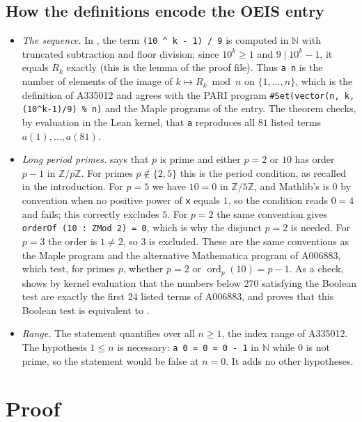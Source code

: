 \documentclass[11pt]{amsart}
\theoremstyle{plain}
\theoremstyle{definition}
\newcommand{\N}{\mathbb{N}}
\newcommand{\Z}{\mathbb{Z}}
\DeclareMathOperator{\ord}{ord}
\begin{document}
\subsection*{How the definitions encode the OEIS entry}
\begin{itemize}
\item \emph{The sequence.} In , the term \texttt{(10 \^{} k - 1) / 9} is computed in $\N$ with truncated subtraction and floor division; since $10^k\ge1$ and $9\mid 10^k-1$, it equals $R_k$ exactly (this is the lemma  of the proof file). Thus \texttt{a n} is the number of elements of the image of $k\mapsto R_k \bmod n$ on $\{1,\dots,n\}$, which is the definition of A335012 and agrees with the PARI program \texttt{\#Set(vector(n, k, (10\^{}k-1)/9) \% n)} and the Maple programs of the entry. The theorem  checks, by evaluation in the Lean kernel, that \texttt{a} reproduces all $81$ listed terms $a(1),\dots,a(81)$.
\item \emph{Long period primes.}  says that $p$ is prime and either $p=2$ or $10$ has order $p-1$ in $\Z/p\Z$. For primes $p\notin\{2,5\}$ this is the period condition, as recalled in the introduction. For $p=5$ we have $10=0$ in $\Z/5\Z$, and Mathlib's  is $0$ by convention when no positive power of \texttt{x} equals $1$, so the condition reads $0=4$ and fails; this correctly excludes $5$. For $p=2$ the same convention gives \texttt{orderOf (10 : ZMod 2) = 0}, which is why the disjunct $p=2$ is needed. For $p=3$ the order is $1\ne2$, so $3$ is excluded. These are the same conventions as the Maple program and the alternative Mathematica program of A006883, which test, for primes $p$, whether $p=2$ or $\ord_p(10)=p-1$. As a check,  shows by kernel evaluation that the numbers below $270$ satisfying the Boolean test  are exactly the first $24$ listed terms of A006883, and  proves that this Boolean test is equivalent to .
\item \emph{Range.} The statement quantifies over all $n\ge1$, the index range of A335012. The hypothesis $1\le n$ is necessary: \texttt{a 0 = 0 = 0 - 1} in $\N$ while $0$ is not prime, so the statement would be false at $n=0$. It adds no other hypotheses.
\end{itemize}

\section{Proof}\label{sec:proof}
\end{document}
